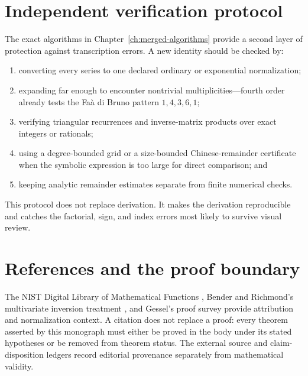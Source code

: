 \documentclass[11pt,a4paper,oneside,openany]{book}
\theoremstyle{definition}
\theoremstyle{remark}
\begin{document}
\section{Independent verification protocol}
The exact algorithms in Chapter~\ref{ch:merged-algorithms} provide a second layer of
protection against transcription errors.  A new identity should be checked by:
\begin{enumerate}
\item converting every series to one declared ordinary or exponential
      normalization;
\item expanding far enough to encounter nontrivial multiplicities---fourth order
      already tests the Fa\`a di Bruno pattern $1,4,3,6,1$;
\item verifying triangular recurrences and inverse-matrix products over exact
      integers or rationals;
\item using a degree-bounded grid or a size-bounded Chinese-remainder certificate
      when the symbolic expression is too large for direct comparison; and
\item keeping analytic remainder estimates separate from finite numerical checks.
\end{enumerate}
This protocol does not replace derivation.  It makes the derivation reproducible and
catches the factorial, sign, and index errors most likely to survive visual review.

\section{References and the proof boundary}
The NIST Digital Library of Mathematical Functions \cite{NISTDLMF}, Bender and
Richmond's multivariate inversion treatment \cite{BenderRichmond1998}, and
Gessel's proof survey \cite{Gessel2016} provide attribution and normalization
context.  A citation does not replace a proof: every theorem asserted by this
monograph must either be proved in the body under its stated hypotheses or be
removed from theorem status.  The external source and claim-disposition ledgers
record editorial provenance separately from mathematical validity.
\end{document}
